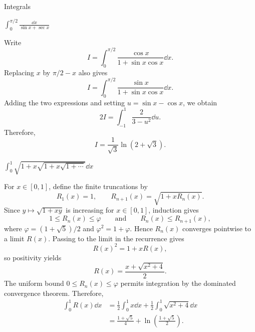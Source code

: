 \begin{expectedproblemgroup}{Integrals}
        \begin{expectedsubproblem}
            \(\displaystyle
                \int_0^{\pi/2}\frac{\dd x}{\sin x+\sec x}
            \)
        \end{expectedsubproblem}

        \begin{expectedsubsolution}
            Write
            \[
                I
                =
                \int_0^{\pi/2}
                \frac{\cos x}{1+\sin x\cos x}\dd x.
            \]
            Replacing $x$ by $\pi/2-x$ also gives
            \[
                I
                =
                \int_0^{\pi/2}
                \frac{\sin x}{1+\sin x\cos x}\dd x.
            \]
            Adding the two expressions and setting
            $u=\sin x-\cos x$, we obtain
            \[
                2I
                =
                \int_{-1}^{1}\frac{2}{3-u^2}\dd u.
            \]
            Therefore,
            \[
                \boxed{
                    I=\frac{1}{\sqrt3}\ln(2+\sqrt3)
                }.
            \]
        \end{expectedsubsolution}

        \begin{expectedsubproblem}
            \(\displaystyle
                \int_0^1\sqrt{1+x\sqrt{1+x\sqrt{1+\cdots}}}\dd x
            \)
        \end{expectedsubproblem}

        \begin{expectedsubsolution}
            For $x\in[0,1]$, define the finite truncations by
            \[
                R_1(x)=1,
                \qquad
                R_{n+1}(x)=\sqrt{1+xR_n(x)}.
            \]
            Since $y\mapsto\sqrt{1+xy}$ is increasing for $x\in[0,1]$, induction
            gives
            \[
                1\leq R_n(x)\leq\varphi
                \qquad\text{and}\qquad
                R_n(x)\leq R_{n+1}(x),
            \]
            where $\varphi=(1+\sqrt5)/2$ and $\varphi^2=1+\varphi$. Hence
            $R_n(x)$ converges pointwise to a limit $R(x)$. Passing to the limit in
            the recurrence gives
            \[
                R(x)^2=1+xR(x),
            \]
            so positivity yields
            \[
                R(x)=\frac{x+\sqrt{x^2+4}}{2}.
            \]
            The uniform bound $0\leq R_n(x)\leq\varphi$ permits integration by the
            dominated convergence theorem. Therefore,
            \[
                \begin{aligned}
                    \int_0^1R(x)\dd x
                    &=
                    \frac12\int_0^1x\dd x
                    +
                    \frac12\int_0^1\sqrt{x^2+4}\dd x\\
                    &=
                    \boxed{
                        \frac{1+\sqrt5}{4}
                        +
                        \ln\left(\frac{1+\sqrt5}{2}\right)
                    }.
                \end{aligned}
            \]
        \end{expectedsubsolution}


\end{expectedproblemgroup}
